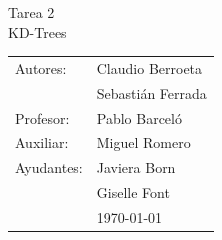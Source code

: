 \documentclass[12pt,letterpaper, margin = 3cm]{article}
\begin{document}
\newpage
\pagestyle{fancy}
\fancyhf{}
\vspace*{5cm}
\begin{center}
\huge  {Tarea 2}\\
\Huge {KD-Trees}\\
\vspace{6cm}
\end{center}
\vfill
\begin{flushright}
\begin{tabular}{ll}
Autores: & Claudio Berroeta\\
& Sebastián Ferrada \\
Profesor: & Pablo Barceló\\
Auxiliar: & Miguel Romero\\
Ayudantes: & Javiera Born\\
& Giselle Font\\
& \today\\
\end{tabular}
\end{flushright}

\newpage
\pagestyle{fancy}
\fancyhf{}

\fancyhead[R]{\small \rm \textbf{\thepage}} %



\renewcommand{\sectionmark}[1]{\markright{\thesection.\ #1}}
\renewcommand{\headrulewidth}{0.5pt}
\renewcommand{\footrulewidth}{0.5pt}
\newcommand{\fancyfootnotetext}[2]{%
  \fancypagestyle{dingens}{%
    \fancyfoot[LO,RE]{\parbox{12cm}{\footnotemark[#1]\footnotesize #2}}%
  }%
  \thispagestyle{dingens}%
}
\end{document}
